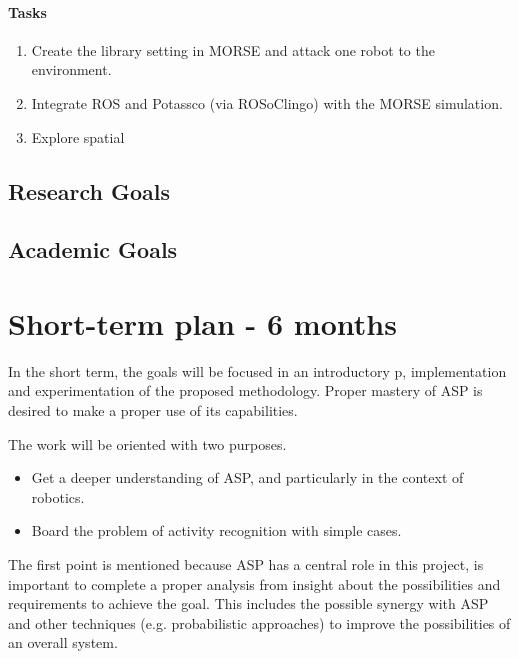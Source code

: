 \paragraph{Tasks}
\begin{enumerate}
\item Create the library setting in MORSE and attack one robot to the environment.
\item Integrate ROS and Potassco (via ROSoClingo) with the MORSE simulation.
\item Explore spatial
\end{enumerate}


\subsection{Research Goals}

\subsection{Academic Goals}







\section{Short-term plan - 6 months}

In the short term, the goals will be focused in an introductory p, implementation and experimentation of the proposed methodology.
Proper mastery of ASP is desired to make a proper use of its capabilities.

The work will be oriented with two purposes.

\begin{itemize}
\item Get a deeper understanding of ASP, and particularly in the context of robotics.
\item Board the problem of activity recognition with simple cases.
\end{itemize}



The first point is mentioned because ASP has a central role in this project, is important to complete a proper analysis from insight about the possibilities and requirements to achieve the goal.
This includes the possible synergy with ASP and other techniques (e.g. probabilistic approaches) to improve the possibilities of an overall system.

